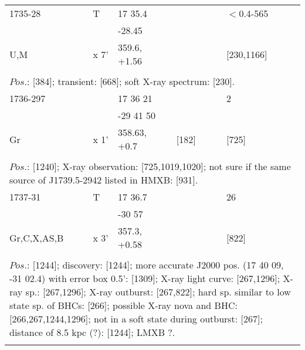 \documentclass{aa}
\begin{document}
\begin{tabular}{p{2.5cm}p{1cm}p{1.8cm}p{2.3cm}p{3.3cm}p{2.0cm}p{2.2cm}}
\noalign{\smallskip}
1735-28          & T                 & 17 35.4              &                     &                         & $<$0.4-565  &       \\
                         &                    & -28.45                &                     &                         &                        &      \\
U,M                  & x 7'            & 359.6, +1.56      &                     &                        & [230,1166]    &       \\
\\
\multicolumn{7}{p{17.5cm}}{
$Pos$.: [384]; transient: [668]; soft X-ray spectrum: [230].}\\
\noalign{\smallskip}
\hline

\noalign{\smallskip}
1736-297        &             & 17 36 21           &                    &                           & 2              &          \\
                         &             & -29 41 50          &                    &                           &                 &         \\
Gr                    & x 1'      & 358.63, +0.7     & [182]          &                          & [725]       &         \\
\\
\multicolumn{7}{p{17.5cm}}{
$Pos$.: [1240]; X-ray observation: [725,1019,1020]; not sure if the same source of J1739.5-2942 listed in HMXB: [931].}\\
\noalign{\smallskip}
\hline

\noalign{\smallskip}
1737-31            & T            & 17 36.7             &               &                       & 26                 &        \\
                           &                & -30 57               &               &                       &                       &         \\
Gr,C,X,AS,B   & x 3'          & 357.3, +0.58    &               &                       & [822]            &        \\
\\
\multicolumn{7}{p{17.5cm}}{
$Pos$.: [1244]; discovery: [1244]; more accurate J2000 pos. (17 40 09, -31 02.4) with error box 0.5': [1309]; X-ray light 
curve: [267,1296]; X-ray sp.: [267,1296]; X-ray outburst: [267,822]; hard sp. similar to low state sp. of BHCs: [266]; 
possible X-ray nova and BHC: [266,267,1244,1296]; not in a soft state during outburst: [267]; distance of 8.5 kpc (?): 
[1244]; LMXB ?.}\\
\noalign{\smallskip}
\hline


\end{tabular}
\end{document}
